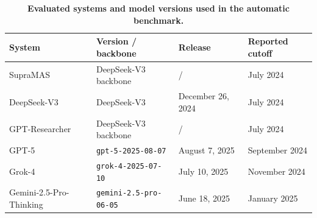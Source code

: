 \begin{table}[htbp]
    \centering
    \caption{\textbf{Evaluated systems and model versions used in the automatic benchmark.}}
    \label{tab:automatic_eval_models}
    \begin{tabularx}{\textwidth}{@{} l l l X @{}}
        \toprule
        \textbf{System} & \textbf{Version / backbone} & \textbf{Release} & \textbf{Reported cutoff} \\
        \midrule
        SupraMAS & DeepSeek-V3 backbone & / & July 2024 \\
        DeepSeek-V3 & DeepSeek-V3 & December 26, 2024 & July 2024 \\
        GPT-Researcher & DeepSeek-V3 backbone & / & July 2024 \\
        GPT-5 & \texttt{gpt-5-2025-08-07} & August 7, 2025 & September 2024 \\
        Grok-4 & \texttt{grok-4-2025-07-10} & July 10, 2025 & November 2024 \\
        Gemini-2.5-Pro-Thinking & \texttt{gemini-2.5-pro-06-05} & June 18, 2025 & January 2025 \\
        \bottomrule
    \end{tabularx}
\end{table}
